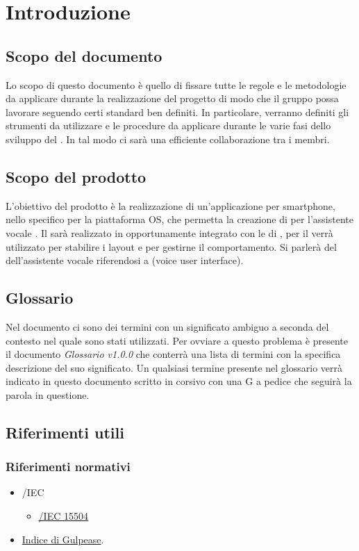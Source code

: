 \section{Introduzione}
\subsection{Scopo del documento}
Lo scopo di questo documento è quello di fissare tutte le regole e le metodologie da applicare durante la realizzazione del progetto di modo che il gruppo possa lavorare seguendo certi standard ben definiti. In particolare, verranno definiti gli strumenti da utilizzare e le procedure da applicare durante le varie fasi dello sviluppo del . In tal modo ci sarà una efficiente collaborazione tra i membri.
\subsection{Scopo del prodotto}
L'obiettivo del prodotto è la realizzazione di un'applicazione per smartphone, nello specifico per la piattaforma  OS, che permetta la creazione di  per l'assistente vocale  . Il  sarà realizzato in  opportunamente integrato con le  di , per il  verrà utilizzato  per stabilire i layout e  per gestirne il comportamento. Si parlerà del  dell'assistente vocale riferendosi a (voice user interface).
\subsection{Glossario}
Nel documento ci sono dei termini con un significato ambiguo a seconda del contesto nel quale sono stati utilizzati. Per ovviare a questo problema è presente il documento \emph{Glossario v1.0.0} che conterrà una lista di termini con la specifica descrizione del suo significato. Un qualsiasi termine presente nel glossario verrà indicato in questo documento scritto in corsivo con una G a pedice che seguirà la parola in questione.
\subsection{Riferimenti utili}
\subsubsection{Riferimenti normativi}
\begin{itemize}
	\item {}/IEC
	\begin{itemize} 
		\item \href{http://www.colonese.it/SviluppoSw_Standard_ISO15504.html}{/IEC 15504}
	\end{itemize}
	\item \href{https://it.wikipedia.org/wiki/Indice_Gulpease}{Indice di Gulpease}.
\end{itemize}
